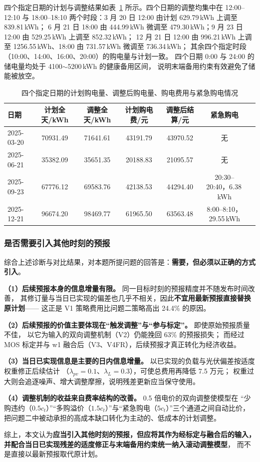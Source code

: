 四个指定日期的计划与调整结果如表~\ref{tab:q3-days} 所示。四个日期的调整均集中在
12:00--12:10 与 18:00--18:10 两个时段：3 月 20 日 12:00 由计划 629.79\,kWh 上调至 839.81\,kWh；
6 月 21 日 18:00 由 444.99\,kWh 微调至 479.30\,kWh；9 月 23 日 12:00 由 529.25\,kWh 上调至 852.32\,kWh；
12 月 21 日 12:00 由 996.21\,kWh 上调至 1256.55\,kWh、18:00 由 731.57\,kWh 微调至 736.34\,kWh；
其余四个指定时段（10:00、14:00、16:00、20:00）的购电量与计划一致。
四个日期 0:00 与 24:00 的储电量均处于 4100$\sim$5200\,kWh 的健康备用区间，
说明末端备用约束有效避免了储能被放空。

\begin{table}[!htbp]
\caption{四个指定日期的计划购电量、调整后购电量、购电费用与紧急购电情况}\label{tab:q3-days}
\centering
\small
\setlength{\tabcolsep}{5pt}
\begin{tabular}{lcccccc}
\toprule
日期 & 计划全天/kWh & 调整全天/kWh & 计划购电费/元 & 调整后结算/元 & 紧急购电 \\
\midrule
2025-03-20 & 70931.49 & 71641.61 & 43191.79 & 43970.52 & 无 \\
2025-06-21 & 35382.09 & 35651.35 & 20188.83 & 21095.57 & 无 \\
2025-09-23 & 67776.12 & 69583.76 & 42138.53 & 44294.40 & 20:30--20:40，6.38\,kWh \\
2025-12-21 & 96674.20 & 98469.77 & 61965.50 & 63563.48 & 8:00--8:10，29.55\,kWh \\
\bottomrule
\end{tabular}
\end{table}

\subsubsection{是否需要引入其他时刻的预报}
综合上述诊断与对比结果，对本题所提问题的回答是：\textbf{需要，但必须以正确的方式引入}。

\textbf{（1）后续预报本身的信息增量有限。} 同一目标时刻的预报精度并不随发布时间改善，
其修订量与当日已实现的偏差也几乎不相关，因此\textbf{不宜用最新预报直接替换原计划}——
这正是 V1 策略费用比问题二策略高出 24.4\% 的原因。

\textbf{（2）后续预报的价值主要体现在“触发调整”与“参与标定”。} 即使原始预报质量不佳，
以它为输入的双向调整机制（V2）仍能挽回 63\% 的预报损失；
而经过 MOS 标定并与 w1 融合后（V3、V4FR），后续预报才真正转化为经济收益。

\textbf{（3）当日已实现信息是主要的日内信息增量。} 以已实现的负载与光伏偏差按适度权重修正后续估计
（$\lambda_{pv}=0.1$、$\lambda_L=0.3$），可使总费用再降低 7.5 万元；
权重过大则会追逐噪声、增大调整摩擦，说明残差更新应当保守使用。

\textbf{（4）调整机制的收益来自费率结构的改善。} 0.5 倍电价的双向调整使模型在
“少购违约（$0.5c_t$）”“多购溢价（$1.5c_t$）”与“紧急购电（$5c_t$）”三个通道之间自动比价，
把问题二中被动承担的高成本缺口转化为主动的、低成本的计划调整。

综上，本文认为\textbf{应当引入其他时刻的预报，但应将其作为经标定与融合后的输入，
并配合当日已实现残差的适度修正与末端备用约束统一纳入滚动调整模型}，
而不是直接以最新预报取代原计划。
